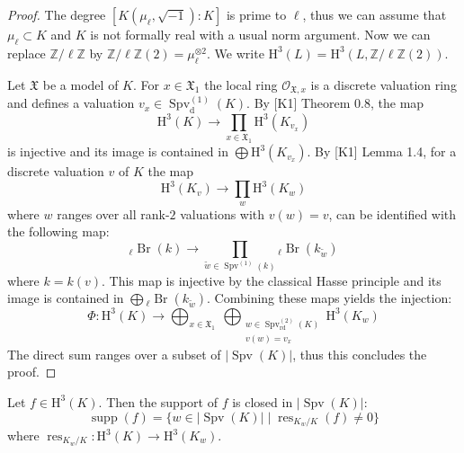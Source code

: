 \begin{proof}
The degree $[K(\mu_\ell, \sqrt{-1}):K]$ is prime to $\ell$, thus we can assume that $\mu_\ell\subset K$ and $K$ is not formally real with a usual norm argument. Now we can replace $\mathbb{Z}/\ell\mathbb{Z}$ by $\mathbb{Z}/\ell\mathbb{Z}(2) = \mu_\ell^{\otimes 2}$. We write $\mathrm{H}^3(L) = \mathrm{H}^3(L, \mathbb{Z}/\ell\mathbb{Z}(2))$. 

Let $\mathfrak{X}$ be a model of $K$. For $x\in\mathfrak{X}_1$ the local ring $\mathcal{O}_{\mathfrak{X}, x}$ is a discrete valuation ring and defines a valuation $v_x\in\operatorname{Spv}_\text{d}^{(1)}(K)$. By [K1] Theorem 0.8, the map
\[ \mathrm{H}^3(K)\longrightarrow \prod_{x\in\mathfrak{X}_1}\mathrm{H}^3(K_{v_x}) \]
is injective and its image is contained in $\bigoplus \mathrm{H}^3(K_{v_x})$. By [K1] Lemma 1.4, for a discrete valuation $v$ of $K$ the map
\[ \mathrm{H}^3(K_v) \longrightarrow \prod_w\mathrm{H}^3(K_w) \]
where $w$ ranges over all rank-$2$ valuations with $v(w) = v$, can be identified with the following map:
\[ {}_\ell\operatorname{Br}(k) \longrightarrow \prod_{\tilde{w}\in\operatorname{Spv}^{(1)}(k)} {}_\ell\operatorname{Br}(k_{\tilde{w}}) \]
where $k = k(v)$. This map is injective by the classical Hasse principle and its image is contained in $\bigoplus {}_\ell\operatorname{Br}(k_{\tilde{w}})$. Combining these maps yields the injection:
\[\Phi: \mathrm{H}^3(K)\longrightarrow \bigoplus_{x\in\mathfrak{X}_1}\  \bigoplus_{\substack{w\in\operatorname{Spv}_\text{rd}^{(2)}(K) \\ v(w) = v_x}} \mathrm{H}^3(K_w) \]
The direct sum ranges over a subset of $|\operatorname{Spv}(K)|$, thus this concludes the proof. 
\end{proof}

\begin{lemma}\label{2.4-closedset}
Let $f\in\mathrm{H}^3(K)$. Then the support of $f$ is closed in $|\operatorname{Spv}(K)|$:
\[ \operatorname{supp}(f) = \{w\in |\operatorname{Spv}(K)|\mid \operatorname{res}_{K_w/K}(f)\neq 0 \} \]
where $\operatorname{res}_{K_w/K}: \mathrm{H}^3(K)\to \mathrm{H}^3(K_w)$.
\end{lemma}

